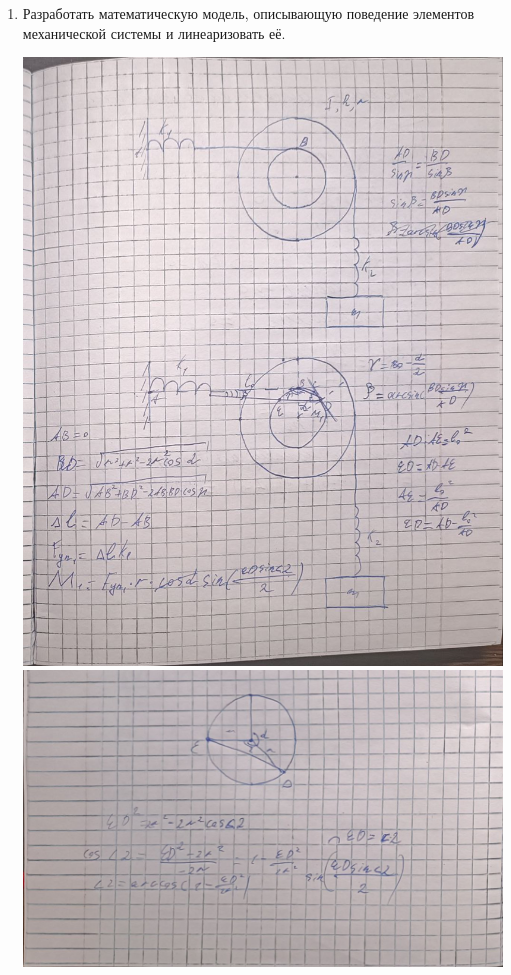 \documentclass[a4paper,14pt]{extarticle}
\begin{document}
\begin{enumerate}[1. ]
    \item Разработать математическую модель, описывающую поведение элементов механической системы и линеаризовать её.\\
          \begin{center}
              \includegraphics[width=140mm]{mod1.jpg}
              \includegraphics[width=140mm]{mod2.jpg}

\end{center}
\end{enumerate}
\end{document}
